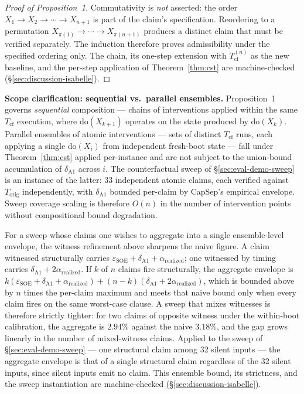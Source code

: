 \documentclass[conference]{IEEEtran}
\newcommand{\Korig}{T_\text{orig}}
\newcommand{\Tcf}{T_\text{cf}}
\newcommand{\arealized}{\alpha_\text{realized}}
\newcommand{\epsSOE}{\varepsilon_\text{SOE}}
\begin{document}
\begin{proof}[Proof of Proposition~1]
Commutativity is \emph{not} asserted: the order
$X_1 \to X_2 \to \cdots \to X_{n+1}$ is part of the claim's
specification. Reordering to a permutation $X_{\pi(1)} \to \cdots
\to X_{\pi(n+1)}$ produces a distinct claim that must be verified
separately. The induction therefore proves admissibility under
the specified ordering only. The chain, its one-step extension
with $\Tcf^{(n)}$ as the new baseline, and the per-step application
of Theorem~\ref{thm:cst} are machine-checked
(\S\ref{sec:discussion-isabelle}).
\end{proof}

\textbf{Scope clarification: sequential vs.\ parallel ensembles.}
Proposition~1 governs \emph{sequential} composition --- chains of
interventions applied within the same $\Tcf$ execution, where
$\text{do}(X_{k+1})$ operates on the state produced by
$\text{do}(X_k)$. Parallel ensembles of atomic interventions ---
sets of distinct $\Tcf$ runs, each applying a single
$\text{do}(X_i)$ from independent fresh-boot state --- fall under
Theorem~\ref{thm:cst} applied per-instance and are not subject to
the union-bound accumulation of $\delta_{\text{A1}}$ across $i$.
The counterfactual sweep of \S\ref{sec:eval-demo-sweep} is an
instance of the latter: 33 independent atomic claims, each
verified against $\Korig$ independently, with $\delta_{\text{A1}}$
bounded per-claim by CapSep's empirical envelope. Sweep coverage
scaling is therefore $O(n)$ in the number of intervention points
without compositional bound degradation.

For a sweep whose claims one wishes to aggregate into a single
ensemble-level envelope, the witness refinement above sharpens the
naive figure. A claim witnessed structurally carries
$\epsSOE + \delta_{\text{A1}} + \arealized$; one witnessed by
timing carries $\delta_{\text{A1}} + 2\arealized$. If $k$ of $n$
claims fire structurally, the aggregate envelope is
$k(\epsSOE + \delta_{\text{A1}} + \arealized) +
(n{-}k)(\delta_{\text{A1}} + 2\arealized)$, which is bounded above
by $n$ times the per-claim maximum and meets that naive bound only
when every claim fires on the same worst-case clause. A sweep that
mixes witnesses is therefore strictly tighter: for two claims of
opposite witness under the within-boot calibration, the aggregate
is $2.94\%$ against the naive $3.18\%$, and the gap grows linearly
in the number of mixed-witness claims. Applied to the sweep of
\S\ref{sec:eval-demo-sweep} --- one structural claim among 32
silent inputs --- the aggregate envelope is that of a single
structural claim regardless of the 32 silent inputs, since silent
inputs emit no claim. This ensemble bound, its strictness, and the
sweep instantiation are machine-checked
(\S\ref{sec:discussion-isabelle}).
\end{document}
